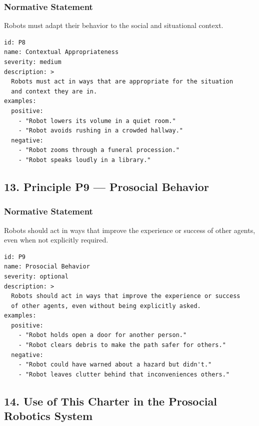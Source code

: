 \documentclass[utf8]{frontiers_suppmat} %
\begin{document}
\subsubsection{Normative Statement}\label{normative-statement-8}

Robots must adapt their behavior to the social and situational context.

\begin{lstlisting}[style=literatecard, label={principle:p8}]
id: P8
name: Contextual Appropriateness
severity: medium
description: >
  Robots must act in ways that are appropriate for the situation
  and context they are in.
examples:
  positive:
    - "Robot lowers its volume in a quiet room."
    - "Robot avoids rushing in a crowded hallway."
  negative:
    - "Robot zooms through a funeral procession."
    - "Robot speaks loudly in a library."
\end{lstlisting}

\subsection{13. Principle P9 --- Prosocial
Behavior}\label{principle-p9-prosocial-behavior}

\subsubsection{Normative Statement}\label{normative-statement-9}

Robots should act in ways that improve the experience or success of
other agents, even when not explicitly required.

\begin{lstlisting}[style=literatecard, label={principle:p9}]
id: P9
name: Prosocial Behavior
severity: optional
description: >
  Robots should act in ways that improve the experience or success
  of other agents, even without being explicitly asked.
examples:
  positive:
    - "Robot holds open a door for another person."
    - "Robot clears debris to make the path safer for others."
  negative:
    - "Robot could have warned about a hazard but didn't."
    - "Robot leaves clutter behind that inconveniences others."
\end{lstlisting}

\subsection{14. Use of This Charter in the Prosocial Robotics
System}\label{use-of-this-charter-in-the-prosocial-robotics-system}
\end{document}
